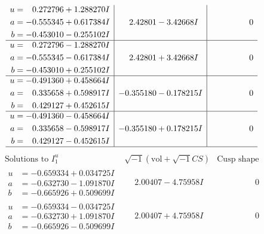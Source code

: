 \documentclass[1p]{elsarticle_modified}
\theoremstyle{definition}
\newcommand{\I}{\sqrt{-1}}
\begin{document}
$$\begin{array}{c|c|c}
\begin{aligned}
u &= \phantom{-}0.272796 + 1.288270 I \\
a &= -0.555345 + 0.617384 I \\
b &= -0.453010 - 0.255102 I\end{aligned}
 & \phantom{-}2.42801 - 3.42668 I & \phantom{-0.000000 } 0 \\ \hline\begin{aligned}
u &= \phantom{-}0.272796 - 1.288270 I \\
a &= -0.555345 - 0.617384 I \\
b &= -0.453010 + 0.255102 I\end{aligned}
 & \phantom{-}2.42801 + 3.42668 I & \phantom{-0.000000 } 0 \\ \hline\begin{aligned}
u &= -0.491360 + 0.458664 I \\
a &= \phantom{-}0.335658 + 0.598917 I \\
b &= \phantom{-}0.429127 + 0.452615 I\end{aligned}
 & -0.355180 - 0.178215 I & \phantom{-0.000000 } 0 \\ \hline\begin{aligned}
u &= -0.491360 - 0.458664 I \\
a &= \phantom{-}0.335658 - 0.598917 I \\
b &= \phantom{-}0.429127 - 0.452615 I\end{aligned}
 & -0.355180 + 0.178215 I & \phantom{-0.000000 } 0\\
 \hline 
 \end{array}$$\newpage$$\begin{array}{c|c|c}  
\text{Solutions to }I^u_{1}& \I (\text{vol} + \sqrt{-1}CS) & \text{Cusp shape}\\
 \hline 
\begin{aligned}
u &= -0.659334 + 0.034725 I \\
a &= -0.632730 - 1.091870 I \\
b &= -0.665926 + 0.509699 I\end{aligned}
 & \phantom{-}2.00407 - 4.75958 I & \phantom{-0.000000 } 0 \\ \hline\begin{aligned}
u &= -0.659334 - 0.034725 I \\
a &= -0.632730 + 1.091870 I \\
b &= -0.665926 - 0.509699 I\end{aligned}
 & \phantom{-}2.00407 + 4.75958 I & \phantom{-0.000000 } 0 \\ \hline\begin{aligned}

\end{aligned}
\end{array}$$
\end{document}
